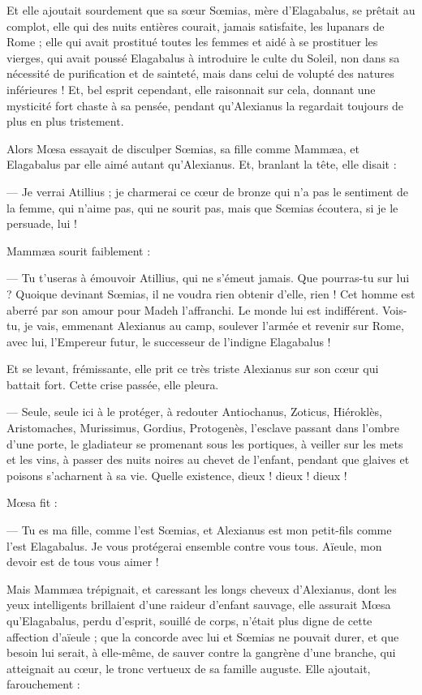 \documentclass[a4paper, 11pt, oneside, polutonikogreek, french]{article}
\begin{document}
Et elle ajoutait sourdement que sa sœur Sœmias, mère d'Elagabalus, se prêtait au complot, elle qui des nuits entières courait, jamais satisfaite, les lupanars de Rome ; elle qui avait prostitué toutes les femmes et aidé à se prostituer les vierges, qui avait poussé Elagabalus à introduire le culte du Soleil, non dans sa nécessité de purification et de sainteté, mais dans celui de volupté des natures inférieures ! Et, bel esprit cependant, elle raisonnait sur cela, donnant une mysticité fort chaste à sa pensée, pendant qu'Alexianus la regardait toujours de plus en plus tristement.

Alors Mœsa essayait de disculper Sœmias, sa fille comme Mammæa, et Elagabalus par elle aimé autant qu'Alexianus. Et, branlant la tête, elle disait :

--- Je verrai Atillius ; je charmerai ce cœur de bronze qui n'a pas le sentiment de la femme, qui n'aime pas, qui ne sourit pas, mais que Sœmias écoutera, si je le persuade, lui !

Mammæa sourit faiblement :

--- Tu t'useras à émouvoir Atillius, qui ne s'émeut jamais. Que pourras-tu sur lui ? Quoique devinant Sœmias, il ne voudra rien obtenir d'elle, rien ! Cet homme est aberré par son amour pour Madeh l'affranchi. Le monde lui est indifférent. Vois-tu, je vais, emmenant Alexianus au camp, soulever l'armée et revenir sur Rome, avec lui, l'Empereur futur, le successeur de l'indigne Elagabalus !

Et se levant, frémissante, elle prit ce très triste Alexianus sur son cœur qui battait fort. Cette crise passée, elle pleura.

--- Seule, seule ici à le protéger, à redouter Antiochanus, Zoticus, Hiéroklès, Aristomaches, Murissimus, Gordius, Protogenès, l'esclave passant dans l'ombre d'une porte, le gladiateur se promenant sous les portiques, à veiller sur les mets et les vins, à passer des nuits noires au chevet de l'enfant, pendant que glaives et poisons s'acharnent à sa vie. Quelle existence, dieux ! dieux ! dieux !

Mœsa fit :

--- Tu es ma fille, comme l'est Sœmias, et Alexianus est mon petit-fils comme l'est Elagabalus. Je vous protégerai ensemble contre vous tous. Aïeule, mon devoir est de tous vous aimer !

Mais Mammæa trépignait, et caressant les longs cheveux d'Alexianus, dont les yeux intelligents brillaient d'une raideur d'enfant sauvage, elle assurait Mœsa qu'Elagabalus, perdu d'esprit, souillé de corps, n'était plus digne de cette affection d'aïeule ; que la concorde avec lui et Sœmias ne pouvait durer, et que besoin lui serait, à elle-même, de sauver contre la gangrène d'une branche, qui atteignait au cœur, le tronc vertueux de sa famille auguste. Elle ajoutait, farouchement :
\end{document}
